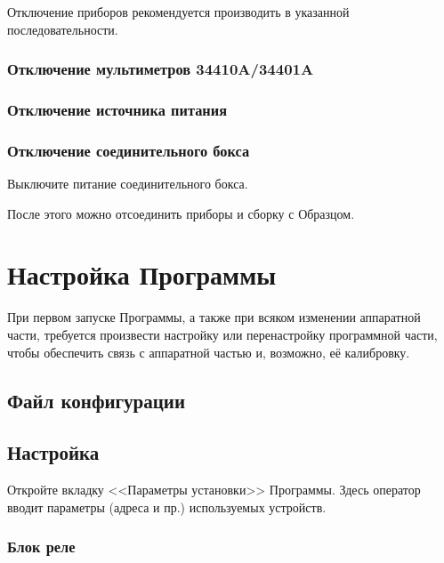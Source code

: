\documentclass[12pt, a4paper, twocolumn]{report}
\begin{document}
Отключение приборов рекомендуется производить в указанной последовательности.

\subsection{Отключение мультиметров 34410A/34401A}



\subsection{Отключение источника питания}



\subsection{Отключение соединительного бокса}

Выключите питание соединительного бокса.

\bigskip

После этого можно отсоединить приборы и сборку с Образцом.

\chapter{Настройка Программы}

При первом запуске Программы, а также при всяком изменении аппаратной части, требуется произвести настройку или перенастройку программной части, чтобы обеспечить связь с аппаратной частью и, возможно, её калибровку.

\section{Файл конфигурации}



\section{Настройка}

Откройте вкладку <<Параметры установки>> Программы. Здесь оператор вводит параметры (адреса и пр.) используемых устройств.

\subsection{Блок реле}
\end{document}
